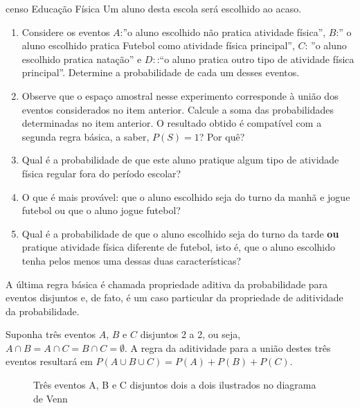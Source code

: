 \begin{task}{censo Educação Física}
Um aluno desta escola será escolhido ao acaso.
\begin{enumerate}
\item {} 
Considere os eventos  \(A\):{}”o aluno escolhido não pratica atividade física”, \(B\):”{} o aluno escolhido pratica Futebol como atividade física principal”, \(C\): ”o aluno escolhido pratica natação”{} e \(D:\):“o aluno pratica outro tipo de atividade física principal”. Determine a probabilidade de cada um desses eventos.

\item {} 
Observe que o espaço amostral nesse experimento corresponde à união dos eventos considerados no item anterior. Calcule a soma das probabilidades determinadas no item anterior. O resultado obtido é compatível com a segunda regra básica, a saber, \(P(S)=1\)? Por quê?

\item {} 
Qual é a probabilidade de que este aluno pratique algum tipo de atividade física regular fora do período escolar?

\item {} 
O que é mais provável: que o aluno escolhido seja do turno da manhã e jogue futebol ou que o aluno jogue futebol?

\item {} 
Qual é a probabilidade de que o aluno escolhido seja do turno da tarde \textbf{ou} pratique atividade física diferente de futebol, isto é, que o aluno escolhido tenha pelos menos uma dessas duas características?

\end{enumerate}
\end{task}



A última regra básica é chamada propriedade aditiva da probabilidade para eventos disjuntos e, de fato, é um caso particular da propriedade de aditividade da probabilidade.

Suponha três eventos \(A\), \(B\) e \(C\) disjuntos 2 a 2, ou seja, \(A\cap B=A\cap C=B\cap C=\emptyset\). A regra da aditividade para a união destes três eventos resultará em \(P(A\cup B\cup C)=P(A)+P(B)+P(C)\).
\begin{figure}[H]
\centering


\caption{Três eventos A, B e C disjuntos dois a dois ilustrados no diagrama de Venn}

\end{figure}


